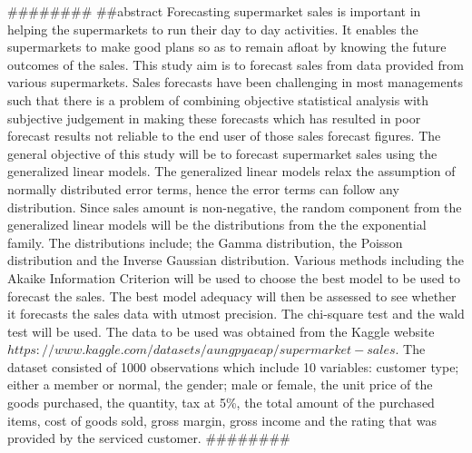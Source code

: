 ########
##abstract
Forecasting supermarket sales is important in helping the supermarkets to run their day to day activities. It enables the supermarkets to make good plans so as to remain afloat by knowing the future outcomes of the sales. This study aim is to forecast sales from data provided from various supermarkets. Sales forecasts have been challenging in most managements such that there is a problem of combining objective statistical analysis with subjective judgement in making these forecasts which has resulted in poor forecast results not reliable to the end user of those sales forecast figures. The general objective of this study will be to forecast supermarket sales using the generalized linear models. The generalized linear models relax the assumption of normally distributed error terms, hence the error terms can follow any distribution. Since sales amount is non-negative, the random component from the generalized linear models will be the distributions from the the exponential family. The distributions  include; the Gamma distribution, the Poisson distribution and the Inverse Gaussian distribution. Various methods including the Akaike Information Criterion will be used to choose the best model to be used to forecast the sales. The best model  adequacy will then be assessed to see whether it forecasts the sales data with utmost precision. The chi-square test and the wald test will be used. The data to be used was obtained from the Kaggle website $https://www.kaggle.com/datasets/aungpyaeap/supermarket-sales$. The dataset consisted of 1000 observations which include 10 variables: customer type; either a member or normal, the gender; male or female, the unit price of the goods purchased, the quantity, tax at 5\%, the total amount of the purchased items, cost of goods sold, gross margin, gross income and the rating that was provided by the serviced customer.
########